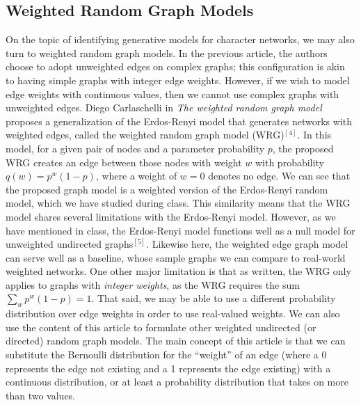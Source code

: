 \documentclass{article}
\begin{document}
\subsection{Weighted Random Graph Models}
On the topic of identifying generative models for character networks, we may also turn to weighted random graph models. In the previous article, the authors choose to adopt unweighted edges on complex graphs; this configuration is akin to having simple graphs with integer edge weights. However, if we wish to model edge weights with continuous values, then we cannot use complex graphs with unweighted edges.
\newline\newline
Diego Carlaschelli in \textit{The weighted random graph model} proposes a generalization of the Erdos-Renyi model that generates networks with weighted edges, called the weighted random graph model (WRG)$^{[4]}$. In this model, for a given pair of nodes and a parameter probability $p$, the proposed WRG creates an edge between those nodes with weight $w$ with probability $q(w) = p^w(1-p)$, where a weight of $w = 0$ denotes no edge.
\newline\newline
We can see that the proposed graph model is a weighted version of the Erdos-Renyi random model, which we have studied during class. This similarity means that the WRG model shares several limitations with the Erdos-Renyi model. However, as we have mentioned in class, the Erdos-Renyi model functions well as a null model for unweighted undirected graphs$^{[5]}$. Likewise here, the weighted edge graph model can serve well as a baseline, whose sample graphs we can compare to real-world weighted networks.
\newline\newline
One other major limitation is that as written, the WRG only applies to graphs with \textit{integer weights}, as the WRG requires the sum $\sum_w p^w (1 - p) = 1$. That said, we may be able to use a different probability distribution over edge weights in order to use real-valued weights.
\newline\newline
We can also use the content of this article to formulate other weighted undirected (or directed) random graph models. The main concept of this article is that we can substitute the Bernoulli distribution for the ``weight'' of an edge (where a 0 represents the edge not existing and a 1 represents the edge existing) with a continuous distribution, or at least a probability distribution that takes on more than two values.
\end{document}
